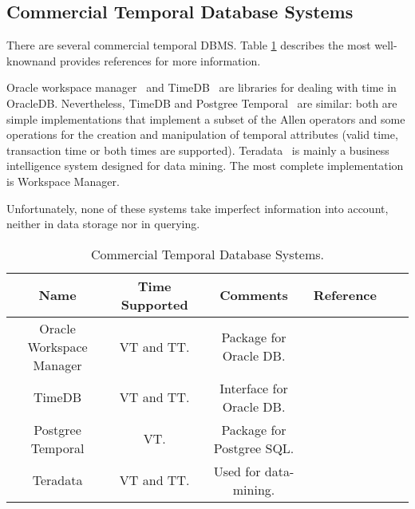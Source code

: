 \subsection{\label{Comm-temp}Commercial Temporal Database Systems}
There are several commercial temporal DBMS. Table \ref{table:commercial-temporal-db} describes the most well-knownand provides references for more information. 

Oracle workspace manager~\cite{oracle2009} and TimeDB~\cite{timedb2005} are libraries for dealing with time in OracleDB. Nevertheless, TimeDB and Postgree Temporal~\cite{posgree2009} are similar: both are simple implementations that implement a subset of the Allen operators and some operations for the creation and manipulation of temporal attributes (valid time, transaction time or both times are supported). Teradata~\cite{teradata2011} is mainly a business intelligence system designed for data mining. The most complete implementation is Workspace Manager.

Unfortunately, none of these systems take imperfect information into account, neither in data storage nor in querying.

\begin{table}
\centering
\caption{Commercial Temporal Database Systems. }
\begin{tabular}{c c c c c c }
\hline
\textbf{Name} & \textbf{Time Supported} & \textbf{Comments} & \textbf{Reference}  \\ \hline
Oracle Workspace Manager & VT and TT. & Package for Oracle DB. & \cite{oracle2009}\\
TimeDB & VT and TT. & Interface for Oracle DB. & \cite{timedb2005}\\
Postgree Temporal & VT. & Package for Postgree SQL. & \cite{posgree2009}\\
Teradata & VT and TT. & Used for data-mining. & \cite{teradata2011}\\
\hline 
\end{tabular}
\label{table:commercial-temporal-db}



\end{table}

